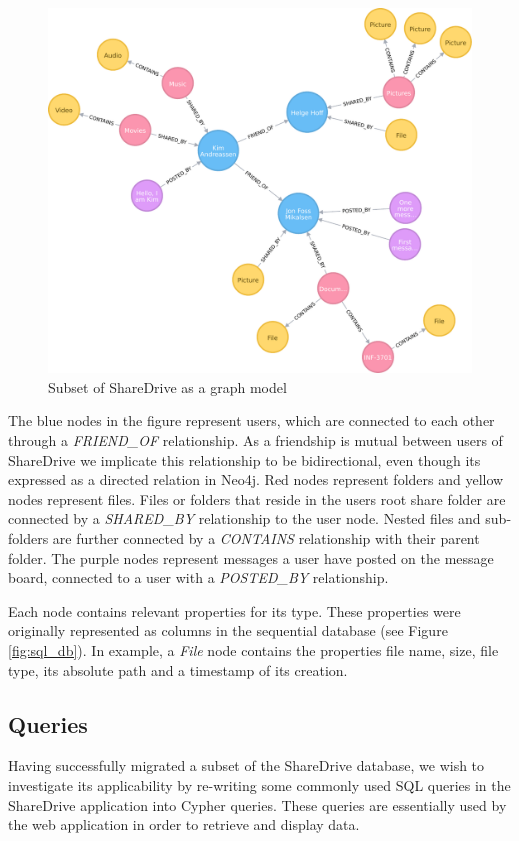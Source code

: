 \documentclass[a4paper, 12pt, conference]{IEEEtran}
\begin{document}
\begin{figure}[h]
	\centering
	\includegraphics[scale=0.45]{graph.pdf}
	\caption{Subset of ShareDrive as a graph model}
	\label{fig:graph_db}
\end{figure}

The blue nodes in the figure represent users, which are connected to each other through a \textit{FRIEND\_OF} relationship. 
As a friendship is mutual between users of ShareDrive we implicate this relationship to be bidirectional, even though its expressed as a directed relation in Neo4j. 
Red nodes represent folders and yellow nodes represent files. 
Files or folders that reside in the users root share folder are connected by a \textit{SHARED\_BY} relationship to the user node. 
Nested files and sub-folders are further connected by a \textit{CONTAINS} relationship with their parent folder. 
The purple nodes represent messages a user have posted on the message board, connected to a user with a \textit{POSTED\_BY} relationship.

Each node contains relevant properties for its type. 
These properties were originally represented as columns in the sequential database (see Figure \ref{fig:sql_db}). 
In example, a \textit{File} node contains the properties file name, size, file type, its absolute path and a timestamp of its creation.
\subsection{Queries}
Having successfully migrated a subset of the ShareDrive database, we wish to investigate its applicability by re-writing some commonly used SQL queries in the ShareDrive application into Cypher queries. 
These queries are essentially used by the web application in order to retrieve and display data.
\end{document}
